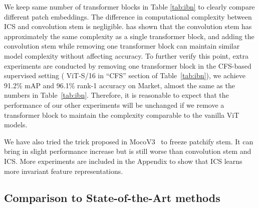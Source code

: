 \documentclass[10pt,twocolumn,letterpaper]{article}
\begin{document}
 We keep same number of transformer blocks in Table \ref{tab:ibn} to clearly compare different patch embeddings. The difference in computational complexity between ICS and convolution stem is negligible. \cite{conv_stem} has shown that the convolution stem has approximately the same complexity as a single transformer block, and adding the convolution stem while removing one transformer block can maintain similar model complexity without affecting accuracy. To further verify this point, extra experiments are conducted by removing one transformer block in the CFS-based supervised setting ( ViT-S/16 in ``CFS'' section of Table~\ref{tab:ibn}), we achieve 91.2\% mAP and 96.1\% rank-1 accuracy on Market, almost the same as the numbers in Table~\ref{tab:ibn}. Therefore, it is reasonable to expect that the performance of our other experiments will be unchanged if we remove a transformer block to maintain the complexity comparable to the vanilla ViT models.

 We have also tried the  trick proposed in MocoV3~\cite{chen2021mocov3} to freeze patchify stem. It can bring in slight performance increase but is still worse than convolution stem and ICS. More experiments are included in the Appendix to show that ICS  learns more invariant feature representations. 


\subsection{Comparison to State-of-the-Art methods}
\end{document}
